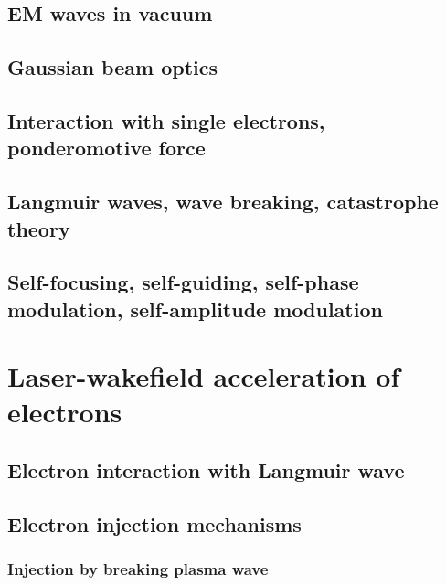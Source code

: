 \documentclass[10pt, twoside, a4paper, openright]{report}
\begin{document}
\section{EM waves in vacuum}
%

\section{Gaussian beam optics}
%

\section{Interaction with single electrons, ponderomotive force}


\section{Langmuir waves, wave breaking, catastrophe theory}
%

\section{Self-focusing, self-guiding, self-phase modulation, self-amplitude modulation}
%


\chapter{Laser-wakefield acceleration of electrons}
%

\section{Electron interaction with Langmuir wave}


\section{Electron injection mechanisms}
%

\subsection{Injection by breaking plasma wave}
%
\end{document}
